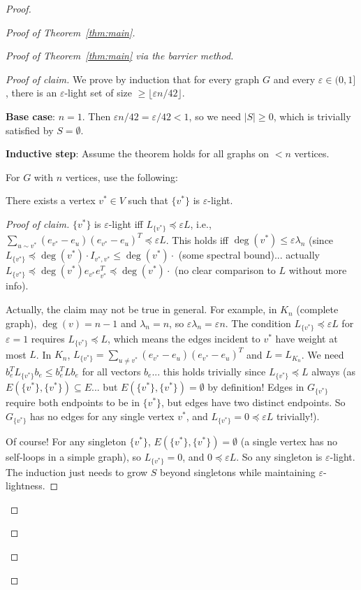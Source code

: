 \documentclass[12pt]{article}
\theoremstyle{definition}
\begin{document}
\begin{proof}
\begin{proof}[Proof of Theorem~\ref{thm:main}]
\begin{proof}[Proof of Theorem~\ref{thm:main} via the barrier method]
\begin{proof}[Proof of claim]
We prove by induction that for every graph $G$ and every $\varepsilon\in(0,1]$, there is an $\varepsilon$-light set of size $\geq\lfloor\varepsilon n/42\rfloor$.

\textbf{Base case}: $n = 1$. Then $\varepsilon n/42 = \varepsilon/42 < 1$, so we need $|S|\geq 0$, which is trivially satisfied by $S = \emptyset$.

\textbf{Inductive step}: Assume the theorem holds for all graphs on $< n$ vertices.

For $G$ with $n$ vertices, use the following:

\begin{claim}
There exists a vertex $v^*\in V$ such that $\{v^*\}$ is $\varepsilon$-light.
\end{claim}

\begin{proof}[Proof of claim]
$\{v^*\}$ is $\varepsilon$-light iff $L_{\{v^*\}}\preceq\varepsilon L$, i.e., $\sum_{u\sim v^*}(e_{v^*}-e_u)(e_{v^*}-e_u)^T\preceq\varepsilon L$. This holds iff $\deg(v^*)\leq\varepsilon\lambda_n$ (since $L_{\{v^*\}}\preceq\deg(v^*)\cdot I_{v^*,v^*}\leq\deg(v^*)\cdot$ (some spectral bound)... actually $L_{\{v^*\}}\preceq\deg(v^*)e_{v^*}e_{v^*}^T\preceq\deg(v^*)\cdot$ (no clear comparison to $L$ without more info).

Actually, the claim may not be true in general. For example, in $K_n$ (complete graph), $\deg(v) = n-1$ and $\lambda_n = n$, so $\varepsilon\lambda_n = \varepsilon n$. The condition $L_{\{v^*\}}\preceq\varepsilon L$ for $\varepsilon = 1$ requires $L_{\{v^*\}}\preceq L$, which means the edges incident to $v^*$ have weight at most $L$. In $K_n$, $L_{\{v^*\}} = \sum_{u\neq v^*}(e_{v^*}-e_u)(e_{v^*}-e_u)^T$ and $L = L_{K_n}$. We need $b_e^T L_{\{v^*\}}b_e\leq b_e^T Lb_e$ for all vectors $b_e$... this holds trivially since $L_{\{v^*\}}\preceq L$ always (as $E(\{v^*\},\{v^*\})\subseteq E$... but $E(\{v^*\},\{v^*\}) = \emptyset$ by definition! Edges in $G_{\{v^*\}}$ require both endpoints to be in $\{v^*\}$, but edges have two distinct endpoints. So $G_{\{v^*\}}$ has no edges for any single vertex $v^*$, and $L_{\{v^*\}} = 0\preceq\varepsilon L$ trivially!).

Of course! For any singleton $\{v^*\}$, $E(\{v^*\},\{v^*\}) = \emptyset$ (a single vertex has no self-loops in a simple graph), so $L_{\{v^*\}} = 0$, and $0\preceq\varepsilon L$. So any singleton is $\varepsilon$-light. The induction just needs to grow $S$ beyond singletons while maintaining $\varepsilon$-lightness.


\end{proof}
\end{proof}
\end{proof}
\end{proof}
\end{proof}
\end{document}
